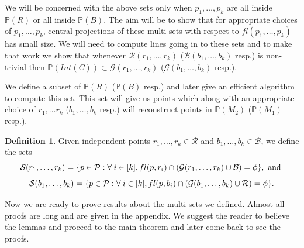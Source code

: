 \documentclass[12pt]{caltech_thesis}
\theoremstyle{plain}
\theoremstyle{definition}
\newtheorem{definition}{Definition}
\newcommand{\MS}{\mathcal{S}}
\newcommand{\MB}{\mathcal{B}}
\newcommand{\MP}{\mathcal{P}}
\newcommand{\MR}{\mathcal{R}}
\newcommand{\MG}{\mathcal{G}}
\newcommand{\PP}{\mathbb{P}}
\begin{document}
We will be concerned with the above sets only when $p_1,\ldots,p_k$ are all inside $\PP(R)$ or all inside $\PP(B)$.
The aim will be to show that for appropriate choices of $p_1,\ldots,p_k$, central projections of these multi-sets 
with respect to $fl(p_1,\ldots,p_k)$ has small size. We will need to compute lines going in to these sets and to make that 
work we show that whenever $\MR(r_1,\ldots,r_k)$
($\MB(b_1,\ldots,b_k)$ resp.) is non-trivial then $\PP(Int(C)) \subset \MG(r_1,\ldots,r_k)$ ($\MG(b_1,\ldots,b_k)$ resp.).

We define a subset of $\PP(R)$ ($\PP(B)$ resp.) and later give an efficient algorithm to compute this set. 
This set will give us points which along with an appropriate choice of $r_1,\ldots r_k$ ($b_1,\ldots,b_k$ resp.)
will reconstruct points in $\PP(M_2)$ ($\PP(M_1)$ resp.).
\begin{definition}
Given independent points $r_1,\ldots,r_k \in \MR$ and $b_1,\ldots,b_k\in \MB$, we define the sets
\[
 \MS(r_1,\ldots,r_k) = \{ p \in \MP : \forall\hspace{0.25em} i\in [k] , fl(p,r_i)\cap (\MG(r_1,\ldots,r_k)\cup\MB) = \phi \}, \text{ and }
\]
\[
 \MS(b_1,\ldots,b_k) = \{ p \in \MP : \forall\hspace{0.25em} i\in [k] , fl(p,b_i)\cap (\MG(b_1,\ldots,b_k)\cup \MR) = \phi \}.
\]
\end{definition}


Now we are ready to prove results about the multi-sets we defined. Almost all proofs are long and are given in the appendix.
We suggest the reader to believe the lemmas and proceed to the main theorem and later come back to see the proofs.
\end{document}
